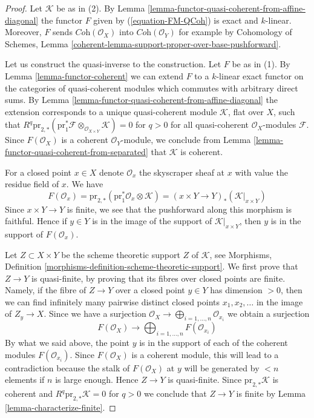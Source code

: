 \documentclass[10pt,a4paper]{amsart}
\theoremstyle{plain}
\theoremstyle{definition}
\theoremstyle{remark}
\numberwithin{equation}{subsection}
\begin{document}
\begin{proof}
Let $\mathcal{K}$ be as in (2). By
Lemma \ref{lemma-functor-quasi-coherent-from-affine-diagonal}
the functor $F$ given by (\ref{equation-FM-QCoh}) is exact and $k$-linear.
Moreover, $F$ sends $\textit{Coh}(\mathcal{O}_X)$ into
$\textit{Coh}(\mathcal{O}_Y)$ for example by
Cohomology of Schemes, Lemma
\ref{coherent-lemma-support-proper-over-base-pushforward}.

\medskip\noindent
Let us construct the quasi-inverse to the construction. Let $F$ be
as in (1). By Lemma \ref{lemma-functor-coherent} we can extend $F$
to a $k$-linear exact functor on the
categories of quasi-coherent modules which commutes with arbitrary direct sums.
By Lemma \ref{lemma-functor-quasi-coherent-from-affine-diagonal}
the extension corresponds to a unique quasi-coherent module
$\mathcal{K}$, flat over $X$, such that
$R^q\text{pr}_{2, *}(\text{pr}_1^*\mathcal{F}
\otimes_{\mathcal{O}_{X \times Y}} \mathcal{K}) = 0$ for $q > 0$
for all quasi-coherent $\mathcal{O}_X$-modules $\mathcal{F}$.
Since $F(\mathcal{O}_X)$ is a coherent $\mathcal{O}_Y$-module, we
conclude from Lemma \ref{lemma-functor-quasi-coherent-from-separated}
that $\mathcal{K}$ is coherent.

\medskip\noindent
For a closed point $x \in X$ denote $\mathcal{O}_x$ the skyscraper sheaf
at $x$ with value the residue field of $x$. We have
$$
F(\mathcal{O}_x) =
\text{pr}_{2, *}(\text{pr}_1^*\mathcal{O}_x \otimes \mathcal{K}) =
(x \times Y \to Y)_*(\mathcal{K}|_{x \times Y})
$$
Since $x \times Y \to Y$ is finite, we see that the pushforward along
this morphism is faithful. Hence if $y \in Y$ is in the image of the
support of $\mathcal{K}|_{x \times Y}$, then $y$ is in the support of
$F(\mathcal{O}_x)$.

\medskip\noindent
Let $Z \subset X \times Y$ be the scheme theoretic support $Z$ of
$\mathcal{K}$, see
Morphisms, Definition \ref{morphisms-definition-scheme-theoretic-support}.
We first prove that $Z \to Y$ is quasi-finite, by proving that its fibres
over closed points are finite. Namely, if the fibre of $Z \to Y$ over a
closed point $y \in Y$ has dimension $> 0$, then we can find infinitely
many pairwise distinct closed points $x_1, x_2, \ldots$ in the image of
$Z_y \to X$. Since we have a surjection
$\mathcal{O}_X \to \bigoplus_{i = 1, \ldots, n} \mathcal{O}_{x_i}$
we obtain a surjection
$$
F(\mathcal{O}_X) \to \bigoplus\nolimits_{i = 1, \ldots, n} F(\mathcal{O}_{x_i})
$$
By what we said above, the point $y$ is in the support of each
of the coherent modules $F(\mathcal{O}_{x_i})$. Since $F(\mathcal{O}_X)$
is a coherent module, this will lead to a contradiction because
the stalk of $F(\mathcal{O}_X)$ at $y$ will be generated by $< n$ elements
if $n$ is large enough. Hence $Z \to Y$ is quasi-finite.
Since $\text{pr}_{2, *}\mathcal{K}$ is coherent and
$R^q\text{pr}_{2, *}\mathcal{K} = 0$ for $q > 0$ we conclude
that $Z \to Y$ is finite by Lemma \ref{lemma-characterize-finite}.
\end{proof}
\end{document}
